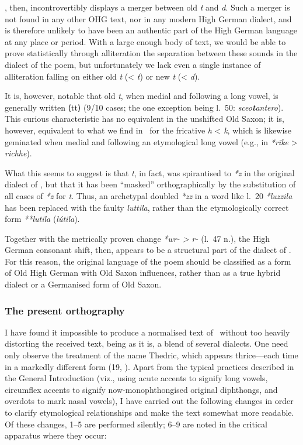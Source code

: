 \Hildebrandslied, then, incontrovertibly displays a merger between old \emph{t} and \emph{d}.  Such a merger is not found in any other OHG text, nor in any modern High German dialect, and is therefore unlikely to have been an authentic part of the High German language at any place or period.  With a large enough body of text, we would be able to prove statistically through alliteration the separation between these sounds in the dialect of the poem, but unfortunately we lack even a single instance of alliteration falling on either old \emph{t} (< \emph{t}) or new \emph{t} (< \emph{d}).

It is, however, notable that old \emph{t}, when medial and following a long vowel, is generally written ⟨tt⟩ (9/10 cases; the one exception being l.~50: \emph{sceo\textbf{t}antero}).  This curious characteristic has no equivalent in the unshifted Old Saxon; it is, however, equivalent to what we find in \Hildebrandslied\ for the fricative \emph{h} < \emph{k}, which is likewise geminated when medial and following an etymological long vowel (e.g., in \emph{*rīke} > \emph{richhe}).

What this seems to suggest is that \emph{t}, in fact, was spirantised to \emph{*z} in the original dialect of \Hildebrandslied, but that it has been “masked” orthographically by the substitution of all cases of \emph{*z} for \emph{t}.  Thus, an archetypal doubled \emph{*zz} in a word like l.~20 \emph{*luzzila} has been replaced with the faulty \emph{luttila}, rather than the etymologically correct form \emph{**lutila} (\emph{lútila}).

Together with the metrically proven change \emph{*wr- > r-} (l.~47 n.), the High German consonant shift, then, appears to be a structural part of the dialect of \Hildebrandslied.  For this reason, the original language of the poem should be classified as a form of Old High German with Old Saxon influences, rather than as a true hybrid dialect or a Germanised form of Old Saxon.

\subsubsection{The present orthography}

I have found it impossible to produce a normalised text of \Hildebrandslied\ without too heavily distorting the received text, being as it is, a blend of several dialects.  One need only observe the treatment of the name Thedric, which appears thrice---each time in a markedly different form (19, ).  Apart from the typical practices described in the General Introduction (viz., using acute accents to signify long vowels, circumflex accents to signify now-monophthongised original diphthongs, and overdots to mark nasal vowels), I have carried out the following changes in order to clarify etymological relationships and make the text somewhat more readable.  Of these changes, 1--5 are performed silently; 6--9 are noted in the critical apparatus where they occur:

